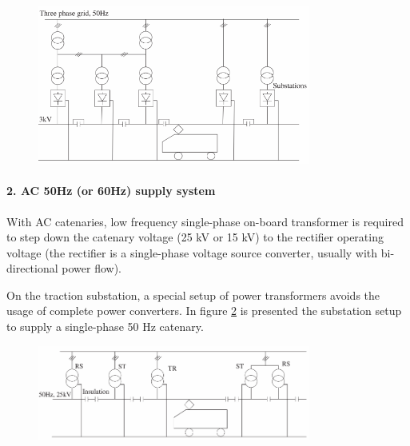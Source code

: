 \begin{figure}[h!]
	\centering
	\begin{minipage}{.6\textwidth}
		\centering
		\includegraphics[width=0.8\textwidth,keepaspectratio]{figures/31.PowerS/abad2016f}
		\label{fig:abad2016f}
	\end{minipage}
\end{figure}




\paragraph{2. AC 50Hz (or 60Hz) supply system\\}

With \ac{AC} catenaries, low frequency single-phase on-board transformer is required to step down the catenary voltage (25 kV or 15 kV) to the rectifier operating voltage (the rectifier is a single-phase voltage source converter, usually with bi-directional power flow).

On the traction substation, a special setup of power transformers avoids the usage of complete power converters. In figure \ref{fig:abad2016d} is presented the substation setup to supply a single-phase 50 Hz catenary.

\begin{figure}[h!]
	\centering
	\begin{minipage}{.6\textwidth}
		\centering
		\includegraphics[width=0.8\textwidth,keepaspectratio]{figures/31.PowerS/abad2016d}
		\label{fig:abad2016d}
	\end{minipage}
\end{figure}


